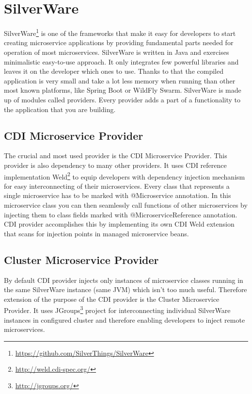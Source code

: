 \documentclass[12pt,oneside]{fithesis2}
\begin{document}
\section{SilverWare}

SilverWare\footnote{\url{https://github.com/SilverThings/SilverWare}} is one of the frameworks that make it easy for developers to start creating microservice applications by providing fundamental parts needed for operation of most microservices. SilverWare is written in Java and exercises minimalistic easy-to-use approach. It only integrates few powerful libraries and leaves it on the developer which ones to use. Thanks to that the compiled application is very small and take a lot less memory when running than other most known platforms, like Spring Boot or WildFly Swarm. SilverWare is made up of modules called providers. Every provider adds a part of a functionality to the application that you are building.

\subsection{CDI Microservice Provider}
The crucial and most used provider is the CDI Microservice Provider. This provider is also dependency to many other providers. It uses CDI\cite{cdi_tutorial} reference implementation Weld\footnote{\url{http://weld.cdi-spec.org/}} to equip developers with dependency injection mechanism for easy interconnecting of their microservices. Every class that represents a single microservice has to be marked with @Microservice annotation. In this microservice class you can then seamlessly call functions of other microservices by injecting them to class fields marked with @MicroserviceReference annotation. CDI provider accomplishes this by implementing its own CDI Weld extension that scans for injection points in managed microservice beans.

\subsection{Cluster Microservice Provider}
By default CDI provider injects only instances of microservice classes running in the same SilverWare instance (same JVM) which isn't too much useful. Therefore extension of the purpose of the CDI provider is the Cluster Microservice Provider. It uses JGroups\footnote{\url{http://jgroups.org/}} project for interconnecting individual SilverWare instances in configured cluster and therefore enabling developers to inject remote microservices.
\end{document}
